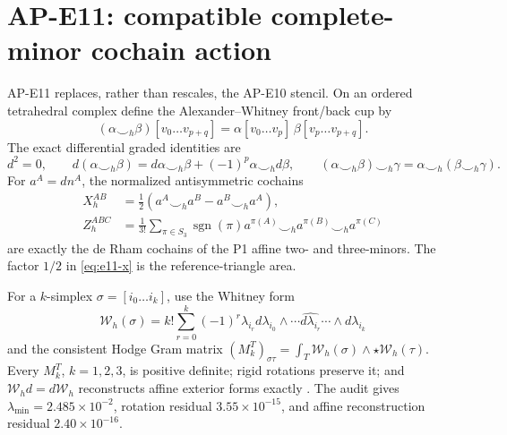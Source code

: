 \section{AP-E11: compatible complete-minor cochain action}

AP-E11 replaces, rather than rescales, the AP-E10 stencil.  On an ordered
tetrahedral complex define the Alexander--Whitney front/back cup by
\begin{equation}
 (\alpha\smile_h\beta)[v_0\ldots v_{p+q}]
 =\alpha[v_0\ldots v_p]\,\beta[v_p\ldots v_{p+q}].
 \label{eq:e11-cup}
\end{equation}
The exact differential graded identities are
\begin{equation}
 d^2=0,\qquad d(\alpha\smile_h\beta)=d\alpha\smile_h\beta
 +(-1)^p\alpha\smile_h d\beta,
 \qquad (\alpha\smile_h\beta)\smile_h\gamma
 =\alpha\smile_h(\beta\smile_h\gamma).
 \label{eq:e11-dga}
\end{equation}
For $a^A=dn^A$, the normalized antisymmetric cochains
\begin{align}
 X_h^{AB}&=\frac12(a^A\smile_h a^B-a^B\smile_h a^A),\label{eq:e11-x}\\
 Z_h^{ABC}&=\frac1{3!}\sum_{\pi\in S_3}\operatorname{sgn}(\pi)
 a^{\pi(A)}\smile_h a^{\pi(B)}\smile_h a^{\pi(C)}
 \label{eq:e11-z}
\end{align}
are exactly the de Rham cochains of the P1 affine two- and three-minors.
The factor $1/2$ in \eqref{eq:e11-x} is the reference-triangle area.

For a $k$-simplex $\sigma=[i_0\ldots i_k]$, use the Whitney form
\begin{equation}
 \mathcal W_h(\sigma)=k!\sum_{r=0}^k(-1)^r\lambda_{i_r}
 d\lambda_{i_0}\wedge\cdots\widehat{d\lambda_{i_r}}\cdots
 \wedge d\lambda_{i_k}
 \label{eq:e11-whitney}
\end{equation}
and the consistent Hodge Gram matrix
$(M_k^T)_{\sigma\tau}=\int_T\mathcal W_h(\sigma)\wedge
\star\mathcal W_h(\tau)$.  Every $M_k^T$, $k=1,2,3$, is positive definite;
rigid rotations preserve it; and $\mathcal W_hd=d\mathcal W_h$ reconstructs
affine exterior forms exactly
\cite{Whitney1957,Dodziuk1976,ArnoldFalkWinther2010}.  The audit gives
$\lambda_{\min}=2.485\times10^{-2}$, rotation residual
$3.55\times10^{-15}$, and affine reconstruction residual
$2.40\times10^{-16}$.

